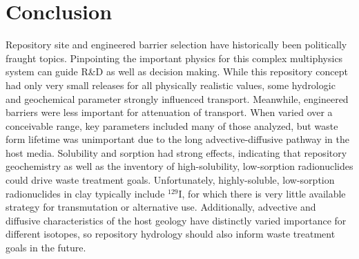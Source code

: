 \section{Conclusion}

Repository site and engineered barrier selection have historically been 
politically fraught topics.  Pinpointing the important physics for this complex 
multiphysics system can guide R\&D as well as decision making.  While this 
repository concept had only very small releases for all physically realistic 
values, some hydrologic and geochemical parameter strongly influenced transport. 
Meanwhile, engineered barriers were less important for attenuation of transport. 
When varied over a conceivable range, key parameters included many of those 
analyzed, but waste form lifetime was unimportant due to the long 
advective-diffusive pathway in the host media. Solubility and sorption had 
strong effects, indicating that repository geochemistry as well as the inventory 
of high-solubility, low-sorption radionuclides could drive waste treatment 
goals. Unfortunately, highly-soluble, low-sorption radionuclides in clay 
typically include $^{129}$I, for which there is very little available strategy 
for transmutation or alternative use. Additionally, advective and diffusive 
characteristics of the host geology have distinctly varied importance for 
different isotopes, so repository hydrology should also inform waste treatment 
goals in the future. 
